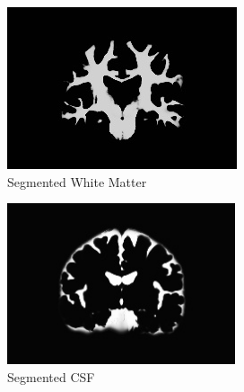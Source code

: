 \documentclass{beamer}
\begin{document}
  \begin{frame}

    \vskip 20pt

    \begin{figure}[H]
      \centering
      \includegraphics[width=0.6\linewidth]{./.img/white-matter.jpg}
      \caption{Segmented White Matter}%
      \label{fig:./.img/grey-matter}
    \end{figure}

  \end{frame}
  \begin{frame}[t]

    \vskip 20pt

    \begin{figure}[H]
      \centering
      \includegraphics[width=0.6\textwidth]{./.img/csf.jpg}
      \caption{Segmented CSF}
    \end{figure}
  \end{frame}
\end{document}
